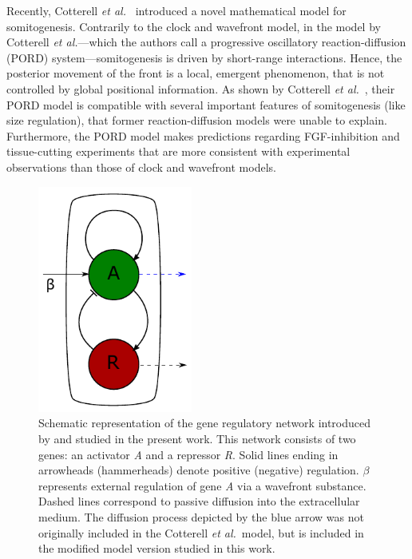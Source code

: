 \documentclass[%
 preprint,
 amsmath,amssymb,
 aps,
]{revtex4-2}
\begin{document}
	Recently, Cotterell {\em et al.}~\citep{Cotterell2015} introduced a novel mathematical model for
	somitogenesis. Contrarily to the clock and wavefront model, in the model by
	Cotterell {\em et al.}---which the authors call a progressive oscillatory
	reaction-diffusion (PORD) system---somitogenesis is driven by short-range
	interactions. Hence, the posterior movement of the front is a local, emergent
	phenomenon, that is not controlled by global positional information. As shown by
	Cotterell {\em et al.}~, their PORD model is compatible with several
	important features of somitogenesis (like size regulation), that former
	reaction-diffusion models were unable to explain. Furthermore, the PORD model
	makes predictions regarding FGF-inhibition and tissue-cutting experiments that
	are more consistent with experimental observations than those of clock and
	wavefront models.
	
	\begin{figure}[t!]
		\centering
		\includegraphics[width=2in]{Figures/Fig01.pdf}
		\caption{Schematic representation of the gene regulatory network introduced by
			\citep{Cotterell2015} and studied in the present work. This network consists of
			two genes: an activator \textit{A} and a repressor \textit{R}. Solid lines
			ending in arrowheads (hammerheads) denote positive (negative) regulation.
			$\beta$ represents external regulation of gene \textit{A} via a wavefront
			substance. Dashed lines correspond to passive diffusion into the extracellular
			medium. The diffusion process depicted by the blue arrow was not
			originally included in the Cotterell {\em et al.}~model, but is 
			included in the modified model version studied in this work.}
		\label{Fig01}
	\end{figure}
	
\end{document}
